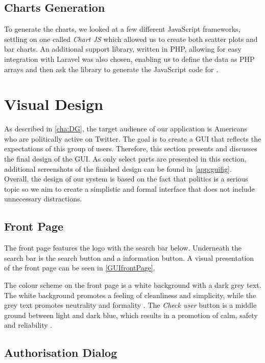 \subsection{Charts Generation}
To generate the charts, we looked at a few different JavaScript
frameworks, settling on one called \textit{Chart JS} which allowed us to
create both scatter plots and bar charts. An additional support library, written in
PHP, allowing for easy integration with Laravel was also chosen, enabling us to
define the data as PHP arrays and then ask the library to generate the
JavaScript code for .

\section{Visual Design} \label{sec:gui-visual-design}
As described in \autoref{cha:DG}, the target audience of our application is
Americans who are politically active on Twitter. The goal is to create a GUI
that reflects the expectations of this group of users. Therefore, this section 
presents and discusses the final design of the GUI. As only select parts are
presented in this section, additional screenshots of the finished design can be
found in \autoref{app:guifig}. \\
Overall, the design of our system is based on the fact that politics is a
serious topic so we aim to create a simplistic and formal interface that does
not include unnecessary distractions.

\subsection{Front Page}
The front page features the logo with the search bar below. Underneath the
search bar is the search button and a information button. A visual presentation
of the front page can be seen in \autoref{GUIfrontPage}.

{}

The colour scheme on the front page is a white background with a dark grey text.
The white background promotes a feeling of cleanliness and simplicity, while the
grey text promotes neutrality and formality \citep[p. 63 \& 64]{WebUI}. 
The \textit{Check user} button is a middle ground between light and dark blue,
which results in a promotion of calm, safety and reliability \citep[p. 61]{WebUI}.

\subsection{Authorisation Dialog}

